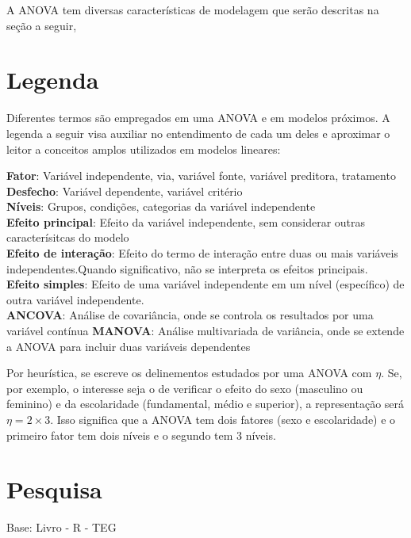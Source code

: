 \documentclass[
]{book}
\begin{document}
A ANOVA tem diversas características de modelagem que serão descritas na seção a seguir,

\hypertarget{legenda}{%
\section{Legenda}\label{legenda}}

Diferentes termos são empregados em uma ANOVA e em modelos próximos. A legenda a seguir visa auxiliar no entendimento de cada um deles e aproximar o leitor a conceitos amplos utilizados em modelos lineares:

\begin{writing}
\textbf{Fator}: Variável independente, via, variável fonte, variável
preditora, tratamento\\
\textbf{Desfecho}: Variável dependente, variável critério\\
\textbf{Níveis}: Grupos, condições, categorias da variável
independente\\
\textbf{Efeito principal}: Efeito da variável independente, sem
considerar outras caracterísitcas do modelo\\
\textbf{Efeito de interação}: Efeito do termo de interação entre duas ou
mais variáveis independentes.Quando significativo, não se interpreta os
efeitos principais.\\
\textbf{Efeito simples}: Efeito de uma variável independente em um nível
(específico) de outra variável independente.\\
\textbf{ANCOVA}: Análise de covariância, onde se controla os resultados
por uma variável contínua \textbf{MANOVA}: Análise multivariada de
variância, onde se extende a ANOVA para incluir duas variáveis
dependentes
\end{writing}

Por heurística, se escreve os delinementos estudados por uma ANOVA com \(\eta\). Se, por exemplo, o interesse seja o de verificar o efeito do sexo (masculino ou feminino) e da escolaridade (fundamental, médio e superior), a representação será \(\eta = 2 \times 3\). Isso significa que a ANOVA tem dois fatores (sexo e escolaridade) e o primeiro fator tem dois níveis e o segundo tem 3 níveis.

\hypertarget{pesquisa-2}{%
\section{Pesquisa}\label{pesquisa-2}}

\begin{alert}

Base: Livro - R - TEG

\end{alert}
\end{document}
